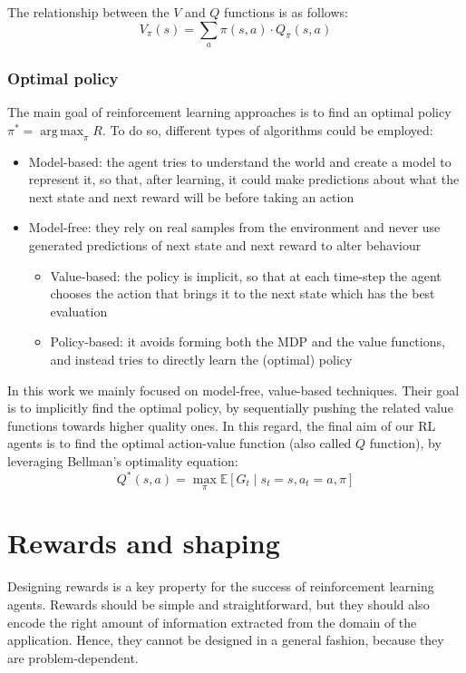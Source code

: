 \documentclass[a4paper,10pt]{report}
\DeclareMathOperator*{\argmax}{arg\,max}
\begin{document}
The relationship between the $V$ and $Q$ functions is as follows:
$$
V_\pi(s)=\sum_a\pi(s,a)\cdot Q_\pi(s,a)
$$

\subsubsection*{Optimal policy}
The main goal of reinforcement learning approaches is to find an optimal policy $\pi^*=\argmax_\pi R$. To do so, different types of algorithms could be employed:
\begin{itemize}
	\item Model-based: the agent tries to understand the world and create a model to represent it, so that, after learning, it could make predictions about what the next state and next reward will be before taking an action
	\item Model-free: they rely on real samples from the environment and never use generated predictions of next state and next reward to alter behaviour
	\begin{itemize}
		\item Value-based: the policy is implicit, so that at each time-step the agent chooses the action that brings it to the next state which has the best evaluation
		\item Policy-based: it avoids forming both the MDP and the value functions, and instead tries to directly learn the (optimal) policy
	\end{itemize}
\end{itemize}

In this work we mainly focused on model-free, value-based techniques. Their goal is to implicitly find the optimal policy, by sequentially pushing the related value functions towards higher quality ones. In this regard, the final aim of our RL agents is to find the optimal action-value function (also called $Q$ function), by leveraging Bellman's optimality equation:
$$
Q^*(s,a)=\max_\pi\mathbb{E}\left[G_t\mid s_t=s,a_t=a,\pi\right]
$$

\section{Rewards and shaping}\label{sec:rewards-shaping}
Designing rewards is a key property for the success of reinforcement learning agents. Rewards should be simple and straightforward, but they should also encode the right amount of information extracted from the domain of the application. Hence, they cannot be designed in a general fashion, because they are problem-dependent.
\end{document}
